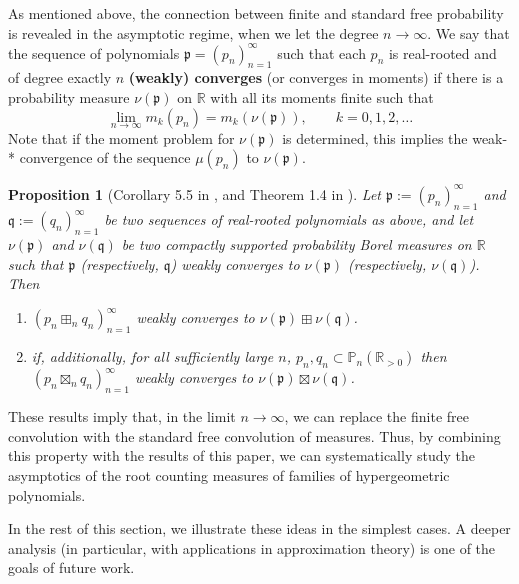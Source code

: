 \documentclass[reqno,11pt]{amsart}
\newtheorem{proposition}[theorem]{Proposition}
\theoremstyle{remark}
\newcommand{\R}{\mathbb{R}}
\newcommand{\pp}{\mathbb{P}}
\newcommand{\rr}{\mathbb{R}}
\begin{document}
As mentioned above, the connection between finite and standard free probability is revealed in the asymptotic regime, when we let the degree $n\to \infty$. We say that the sequence of polynomials $ \mathfrak p= \left(p_n\right)_{n=1}^{\infty}$ such that each $p_n$ is real-rooted and of degree exactly $n$ \textbf{(weakly) converges} (or converges in moments) if there is a probability measure $\nu(\mathfrak p)$ on $\R$ with all its moments finite such that
$$
\lim_{n\to\infty} m_k(p_n)=m_k(\nu (\mathfrak p)), \qquad  k= 0, 1,2,\dots
$$
Note that if the moment problem for $\nu (\mathfrak p)$ is determined, this implies the weak-* convergence of the sequence $\mu (p_n)$ to $\nu (\mathfrak p)$.

\begin{proposition}[Corollary 5.5 in \cite{arizmendi2018cumulants}, and Theorem 1.4 in \cite{arizmendi2021finite}]
    \label{prop:finiteAsymptotics}
    Let $\mathfrak p:=\left(p_n\right)_{n=1}^{\infty}$ and $\mathfrak  q:=\left(q_n\right)_{n=1}^{\infty}$ be two sequences of real-rooted polynomials as above, and let $\nu(\mathfrak p)$ and $\nu(\mathfrak q)$ be two compactly supported probability Borel measures on $\R$ such that $\mathfrak p$ (respectively, $\mathfrak q$) weakly converges to $\nu(\mathfrak p)$ (respectively, $\nu(\mathfrak q)$). Then
    \begin{enumerate}
        \item[(i)]  $\left(p_n \boxplus_n q_n\right)_{n=1}^{\infty}$ weakly converges to $\nu(\mathfrak p) \boxplus \nu(\mathfrak q)$.
        \item[(ii)] if, additionally, for all sufficiently large $n$, $p_n, q_n\subset \pp_n(\rr_{>0})$ then $\left(p_n \boxtimes_n q_n\right)_{n=1}^{\infty}$ weakly converges to $\nu(\mathfrak p) \boxtimes \nu(\mathfrak q)$.
    \end{enumerate}
\end{proposition}

These results imply that, in the limit $n\to \infty$, we can replace the finite free convolution with the standard free convolution of measures. Thus, by combining this property with the results of this paper, we can systematically study the asymptotics of the root counting measures of families of hypergeometric polynomials. 

In the rest of this section, we illustrate these ideas in the simplest cases. A deeper analysis (in particular, with applications in approximation theory) is one of the goals of future work.
\end{document}
